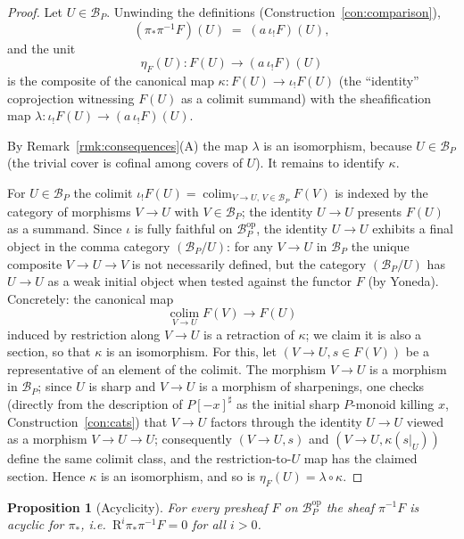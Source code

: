 \documentclass[11pt]{article}
\newtheorem{proposition}[theorem]{Proposition}
\theoremstyle{definition}
\theoremstyle{remark}
\newcommand{\Bcal}{\mathcal{B}}
\newcommand{\op}{\mathrm{op}}
\begin{document}
\begin{proof}
Let $U \in \Bcal_P$.  Unwinding the definitions
(Construction~\ref{con:comparison}),
\[
   (\pi_* \pi^{-1} F)(U) \;=\; (a\, \iota_! F)(U),
\]
and the unit
\[
   \eta_F(U) : F(U) \longrightarrow (a\, \iota_! F)(U)
\]
is the composite of the canonical map
$\kappa : F(U) \to \iota_! F(U)$ (the ``identity'' coprojection witnessing
$F(U)$ as a colimit summand) with the sheafification map
$\lambda : \iota_! F(U) \to (a\,\iota_! F)(U)$.

By Remark~\ref{rmk:consequences}(A) the map $\lambda$ is an isomorphism,
because $U \in \Bcal_P$ (the trivial cover is cofinal among covers of $U$).
It remains to identify $\kappa$.

For $U \in \Bcal_P$ the colimit $\iota_! F(U) = \operatorname*{colim}_{V \to
U,\, V \in \Bcal_P} F(V)$ is indexed by the category of morphisms $V \to U$
with $V \in \Bcal_P$; the identity $U \to U$ presents $F(U)$ as a summand.
Since $\iota$ is fully faithful on $\Bcal_P^{\op}$, the identity $U \to U$
exhibits a final object in the comma category $(\Bcal_P/U)$: for any $V \to U$
in $\Bcal_P$ the unique composite $V \to U \to V$ is not necessarily
defined, but the category $(\Bcal_P / U)$ has $U \to U$ as a weak initial
object when tested against the functor $F$ (by Yoneda).  Concretely: the
canonical map
\[
   \operatorname*{colim}_{V \to U} F(V) \longrightarrow F(U)
\]
induced by restriction along $V \to U$ is a retraction of $\kappa$; we claim
it is also a section, so that $\kappa$ is an isomorphism.  For this, let
$(V \to U, s \in F(V))$ be a representative of an element of the colimit.  The
morphism $V \to U$ is a morphism in $\Bcal_P$; since $U$ is sharp and $V \to U$
is a morphism of sharpenings, one checks (directly from the description of
$P[-x]^{\sharp}$ as the initial sharp $P$-monoid killing $x$,
Construction~\ref{con:cats}) that $V \to U$ factors through the identity
$U \to U$ viewed as a morphism $V \to U \to U$; consequently $(V \to U, s)$
and $(V \to U, \kappa(s|_U))$ define the same colimit class, and the
restriction-to-$U$ map has the claimed section.  Hence $\kappa$ is an
isomorphism, and so is $\eta_F(U) = \lambda \circ \kappa$.
\end{proof}

\begin{proposition}[Acyclicity]\label{prop:acyclic}
For every presheaf $F$ on $\Bcal_P^{\op}$ the sheaf $\pi^{-1} F$ is acyclic
for $\pi_*$, i.e.\ $\mathrm{R}^i \pi_* \pi^{-1} F = 0$ for all $i > 0$.
\end{proposition}
\end{document}
